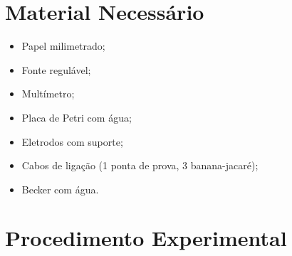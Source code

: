 \section{Material Necessário}

\begin{itemize}
	\item Papel milimetrado;
	\item Fonte regulável;
	\item Multímetro;
	\item Placa de Petri com água;
	\item Eletrodos com suporte;
	\item Cabos de ligação (1 ponta de prova, 3 banana-jacaré);
	\item Becker com água.
\end{itemize}

\section{Procedimento Experimental}

